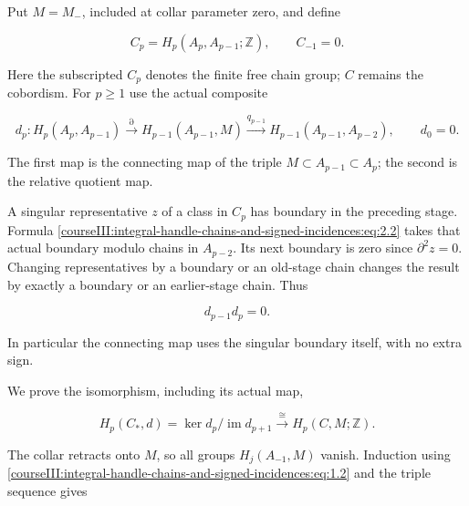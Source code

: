 \label{courseIII:integral-handle-chains-and-signed-incidences:section-2}\label{courseIII:handle-chains:2}

Put \(M=M_-\), included at collar parameter zero, and define

\begin{equation}
C_p=H_p(A_p,A_{p-1};\mathbb Z),\qquad C_{-1}=0.
 \label{courseIII:integral-handle-chains-and-signed-incidences:eq:2.1}
\end{equation}

Here the subscripted \(C_p\) denotes the finite free chain group; \(C\) remains the cobordism. For \(p\geq1\) use the actual composite

\begin{equation}
d_p:
 H_p(A_p,A_{p-1})
 \xrightarrow{\partial}H_{p-1}(A_{p-1},M)
 \xrightarrow{q_{p-1}}H_{p-1}(A_{p-1},A_{p-2}),
 \qquad d_0=0.
 \label{courseIII:integral-handle-chains-and-signed-incidences:eq:2.2}
\end{equation}

The first map is the connecting map of the triple \(M\subset A_{p-1}\subset A_p\); the second is the relative quotient map.

A singular representative \(z\) of a class in \(C_p\) has boundary in the preceding stage. Formula \eqref{courseIII:integral-handle-chains-and-signed-incidences:eq:2.2} takes that actual boundary modulo chains in \(A_{p-2}\). Its next boundary is zero since \(\partial^2z=0\). Changing representatives by a boundary or an old-stage chain changes the result by exactly a boundary or an earlier-stage chain. Thus

\begin{equation}
d_{p-1}d_p=0.
 \label{courseIII:integral-handle-chains-and-signed-incidences:eq:2.3}
\end{equation}

In particular the connecting map uses the singular boundary itself, with no extra sign.

We prove the isomorphism, including its actual map,

\begin{equation}
H_p(C_*,d)=\ker d_p/\operatorname{im}d_{p+1}
 \xrightarrow{\ \cong\ }H_p(C,M;\mathbb Z).
 \label{courseIII:integral-handle-chains-and-signed-incidences:eq:2.4}
\end{equation}

The collar retracts onto \(M\), so all groups \(H_j(A_{-1},M)\) vanish. Induction using \eqref{courseIII:integral-handle-chains-and-signed-incidences:eq:1.2} and the triple sequence gives


